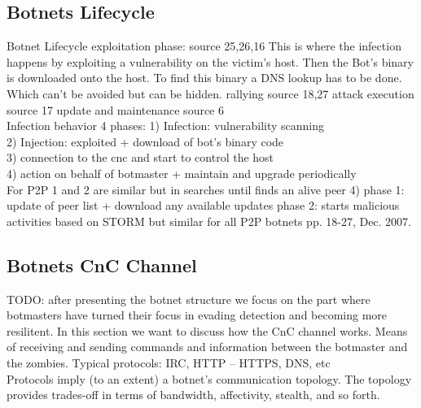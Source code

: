 \subsection{Botnets Lifecycle}

Botnet Lifecycle
exploitation phase: source 25,26,16 This is where the infection happens by exploiting a
vulnerability on the victim's host. Then the Bot's binary is downloaded onto the host. To find
this binary a DNS lookup has to be done. Which can't be avoided but can be hidden.
rallying source 18,27
attack execution source 17
update and maintenance source 6\\
Infection behavior 4 phases: 
1) Infection: vulnerability scanning \\
2) Injection: exploited + download of bot's binary code\\ 
3) connection to the cnc and start to control the host\\
4) action on behalf of botmaster + maintain and upgrade periodically\\
For P2P 1 and 2 are similar but in 
searches until finds an alive peer 4) phase 1: update of peer list + download any available updates phase 2: starts malicious activities
based on STORM but similar for all P2P botnets 
pp. 18-27, Dec. 2007.
\subsection{Botnets CnC Channel}
TODO: after presenting the botnet structure we focus on the part where botmasters have turned their focus in evading detection and becoming more resilitent. In this section we want to discuss how the CnC channel works.
Means of receiving and sending commands and information between the botmaster and the zombies. Typical protocols: IRC, HTTP – HTTPS, DNS, etc\\
Protocols imply (to an extent) a botnet’s communication topology.
        The topology provides trades-off in terms of bandwidth, affectivity, stealth, and so forth.
        

